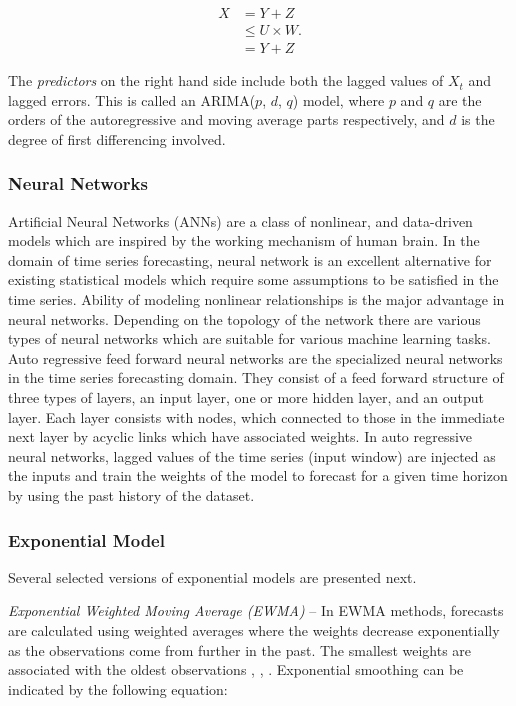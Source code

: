 \begin{align}
  X &= Y + Z \label{eqn:1} \\
    &\leq U \times W. \nonumber \\
    & = Y + Z \tag{a}
\end{align}

The \textit{predictors} on the right hand side include both the lagged values of $X_t$ and lagged errors. This is called an ARIMA($p$, $d$, $q$) model, where $p$ and $q$ are the orders of the autoregressive and moving average parts respectively, and $d$ is the degree of first differencing involved.

\subsubsection{Neural Networks}
Artificial Neural Networks (ANNs) are a class of nonlinear, and data-driven models which are inspired by the working mechanism of human brain. In the domain of time series forecasting, neural network is an excellent alternative for existing statistical models which require some assumptions to be satisfied in the time series. Ability of modeling nonlinear relationships is the major advantage in neural networks. Depending on the topology of the network there are various types of neural networks which are suitable for various machine learning tasks. Auto regressive feed forward neural networks \cite{Forecasting_OTexts} are the specialized neural networks in the time series forecasting domain. They consist of a feed forward structure of three types of layers, an input layer, one or more hidden layer, and an output layer. Each layer consists with nodes, which connected to those in the immediate next layer by acyclic links which have associated weights. In auto regressive neural networks, lagged values of the time series (input window) are injected as the inputs and train the weights of the model to forecast for a given time horizon by using the past history of the dataset. 

\subsubsection{Exponential Model}
Several selected versions of exponential models are presented next.

\noindent
\textit{Exponential Weighted Moving Average (EWMA)} --
In EWMA methods, forecasts are calculated using weighted averages where the weights decrease exponentially as the observations come from further in the past. The smallest weights are associated with the oldest observations \cite{Forecasting_OTexts}, \cite{STAT510}, \cite{StatSoft}. Exponential smoothing can be indicated by the following equation:

